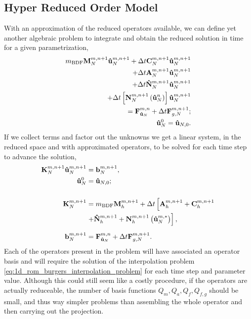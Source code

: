 \documentclass[../../thesis.tex]{subfiles}
\newcommand{\dt}{\ensuremath{\Delta t}}
\newcommand{\Ahm}[1]{\ensuremath{\vb{#1}^{m, n+1}_h}}
\begin{document}
\subsection{Hyper Reduced Order Model}
With an approximation of the reduced operators available, 
we can define yet another algebraic problem to integrate and 
obtain the reduced solution in time for a given parametrization,
\begin{subequations}
    \label{eq:1d_hrom_weak_formulation_discrete}
    \begin{align}
        m_{\text{BDF}} \vb{M}^{m, n+1}_{N} \vb{\hat{u}}_{N}^{m, n+1}
        + \dt \vb{C}^{m, n+1}_{N} \vb{\hat{u}}_{N}^{m, n+1}
        \nonumber 
        \\ 
        + \dt \vb{A}^{m, n+1}_{N} \vb{\hat{u}}_{N}^{m, n+1}
        \nonumber 
        \\ 
        + \dt \vb{\hat{N}}^{m, n+1}_{N} \vb{\hat{u}}_{N}^{m, n+1}
        \nonumber 
        \\ 
        + \dt \left[\vb{N}^{m, n+1}_{N}\left(\vb{\hat{u}}_{N}^{n}\right)\right] \vb{\hat{u}}_{N}^{m, n+1}
        \nonumber
        \\
        = \vb{F}_{\vb{\hat{u}}_{N}}^{m, n}
        + \dt \vb{F}_{g,N}^{m, n+1};
        \\
        \vb{\hat{u}}_N^{0} = \vb{\hat{u}}_{N,0}.
    \end{align}
\end{subequations}
If we collect terms and factor out the unknowns we get a linear system, 
in the reduced space and with approximated operators, 
to be solved for each time step to advance the solution,
\begin{subequations}
    \label{eq:1d_hrom_linear_system_timestep}
    \begin{align}
        \vb{K}_{N}^{m, n+1} \vb{\hat{u}}_{N}^{m, n+1} &= \vb{b}_{N}^{m, n+1}, 
        \\
        \vb{\hat{u}}_{N}^{0} &= \vb{\hat{u}}_{N,0};
        \\[5mm]
        \vb{K}_{N}^{m, n+1} &= m_{\text{BDF}} \Ahm{M} + \dt \left[\Ahm{A} + \Ahm{C} \right. 
        \nonumber 
        \\
                        &\left. + \Ahm{\hat{N}} + \Ahm{N}\left(\vb{\hat{u}}_{N}^{m, *}\right)\right],
        \\[2mm]
        \vb{b}_{N}^{m, n+1} &= \vb{F}_{\vb{\hat{u}}_{N}}^{m,n} + \dt \vb{F}_{g,N}^{m, n+1}.
    \end{align}
\end{subequations}
Each of the operators present in the problem will have associated 
an operator basis and will require the solution of 
the interpolation problem \eqref{eq:1d_rom_burgers_interpolation_problem} 
for each time step and parameter value.
Although this could still seem like a costly procedure, 
if the operators are actually reduceable, 
the number of basis functions $Q_m, Q_a, Q_f, Q_{f,g}$ should be small,
and thus way simpler problems than assembling the whole operator and 
then carrying out the projection.
\end{document}
